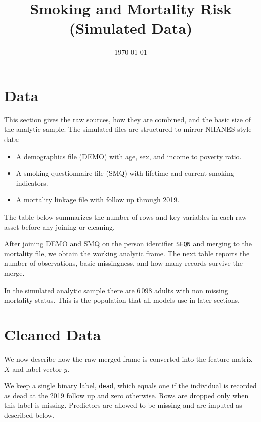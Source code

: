 \documentclass{article}
\title{Smoking and Mortality Risk (Simulated Data)}
\date{\today}
\begin{document}
\maketitle

\section{Data}

This section gives the raw sources, how they are combined, and the basic size of the analytic sample. The simulated files are structured to mirror NHANES style data:

\begin{itemize}
  \item A demographics file (DEMO) with age, sex, and income to poverty ratio.
  \item A smoking questionnaire file (SMQ) with lifetime and current smoking indicators.
  \item A mortality linkage file with follow up through 2019.
\end{itemize}

The table below summarizes the number of rows and key variables in each raw asset before any joining or cleaning.



After joining DEMO and SMQ on the person identifier \texttt{SEQN} and merging to the mortality file, we obtain the working analytic frame. The next table reports the number of observations, basic missingness, and how many records survive the merge.



In the simulated analytic sample there are 6\,098 adults with non missing mortality status. This is the population that all models use in later sections.

\section{Cleaned Data}

We now describe how the raw merged frame is converted into the feature matrix \(X\) and label vector \(y\).

We keep a single binary label, \texttt{dead}, which equals one if the individual is recorded as dead at the 2019 follow up and zero otherwise. Rows are dropped only when this label is missing. Predictors are allowed to be missing and are imputed as described below.
\end{document}

